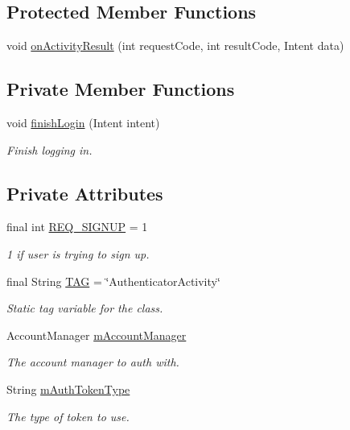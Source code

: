 \subsection*{Protected Member Functions}
\begin{DoxyCompactItemize}
\item 
void \hyperlink{classuk_1_1ac_1_1swan_1_1digitaltrails_1_1accounts_1_1_authenticator_activity_aebc59fcc6d318607ab2866e5ce81859a}{on\+Activity\+Result} (int request\+Code, int result\+Code, Intent data)
\end{DoxyCompactItemize}
\subsection*{Private Member Functions}
\begin{DoxyCompactItemize}
\item 
void \hyperlink{classuk_1_1ac_1_1swan_1_1digitaltrails_1_1accounts_1_1_authenticator_activity_abde795ab2a039e573b08b7e26f028c3f}{finish\+Login} (Intent intent)
\begin{DoxyCompactList}\small\item\em Finish logging in. \end{DoxyCompactList}\end{DoxyCompactItemize}
\subsection*{Private Attributes}
\begin{DoxyCompactItemize}
\item 
final int \hyperlink{classuk_1_1ac_1_1swan_1_1digitaltrails_1_1accounts_1_1_authenticator_activity_a579141e20f12908d216f31855b4b2d8e}{R\+E\+Q\+\_\+\+S\+I\+G\+N\+U\+P} = 1
\begin{DoxyCompactList}\small\item\em 1 if user is trying to sign up. \end{DoxyCompactList}\item 
final String \hyperlink{classuk_1_1ac_1_1swan_1_1digitaltrails_1_1accounts_1_1_authenticator_activity_a527c07643f84f2555652d817b36e3eb7}{T\+A\+G} = \char`\"{}Authenticator\+Activity\char`\"{}
\begin{DoxyCompactList}\small\item\em Static tag variable for the class. \end{DoxyCompactList}\item 
Account\+Manager \hyperlink{classuk_1_1ac_1_1swan_1_1digitaltrails_1_1accounts_1_1_authenticator_activity_adbcc5034a326020bfab8155b451d04ff}{m\+Account\+Manager}
\begin{DoxyCompactList}\small\item\em The account manager to auth with. \end{DoxyCompactList}\item 
String \hyperlink{classuk_1_1ac_1_1swan_1_1digitaltrails_1_1accounts_1_1_authenticator_activity_a7717e101ad13a0c9ee7d6dd0cc8c325a}{m\+Auth\+Token\+Type}
\begin{DoxyCompactList}\small\item\em The type of token to use. \end{DoxyCompactList}\end{DoxyCompactItemize}


